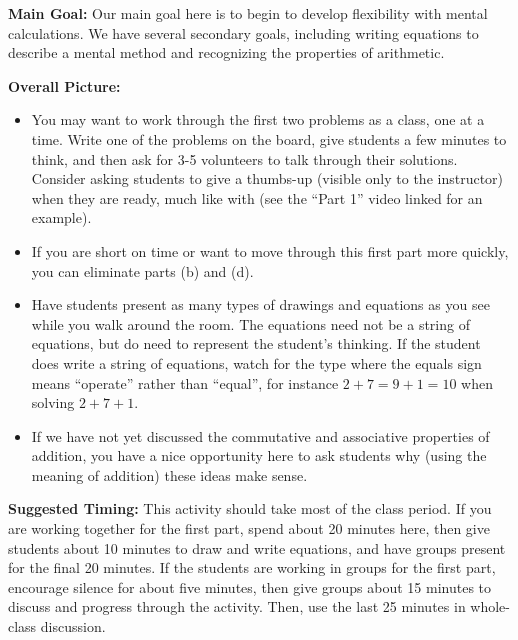 \documentclass{ximera}
\begin{document}
\newpage
\begin{instructorNotes}

{\bf Main Goal:} Our main goal here is to begin to develop flexibility with mental calculations. We have several secondary goals, including writing equations to describe a mental method and recognizing the properties of arithmetic.


{\bf Overall Picture:}

\begin{itemize}
\item You may want to work through the first two problems as a class, one at a time. Write one of the problems on the board, give students a few minutes to think, and then ask for 3-5 volunteers to talk through their solutions. Consider asking students to give a thumbs-up (visible only to the instructor) when they are ready, much like with  (see the ``Part 1'' video linked for an example).
\item If you are short on time or want to move through this first part more quickly, you can eliminate parts (b) and (d).
\item Have students present as many types of drawings and equations as you see while you walk around the room. The equations need not be a string of equations, but do need to represent the student's thinking. If the student does write a string of equations, watch for the type where the equals sign means ``operate'' rather than ``equal'', for instance $2 + 7 = 9 + 1 = 10$ when solving $2 + 7 + 1$.
\item If we have not yet discussed the commutative and associative properties of addition, you have a nice opportunity here to ask students why (using the meaning of addition) these ideas make sense.

\end{itemize}






{\bf Suggested Timing:} This activity should take most of the class period. If you are working together for the first part, spend about 20 minutes here, then give students about 10 minutes to draw and write equations, and have groups present for the final 20 minutes. If the students are working in groups for the first part, encourage silence for about five minutes, then give groups about 15 minutes to discuss and progress through the activity. Then, use the last 25 minutes in whole-class discussion.

\end{instructorNotes}
\end{document}
